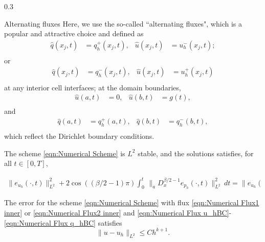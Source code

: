 \documentclass{msuposter}
\newcommand{\uh}{u_h}
\newcommand{\qh}{q_h}
\newcommand{\ph}{p_h}
\newcommand{\qhat}{\hat{q}}
\newcommand{\uhat}{\hat{u}}
\newcommand{\colwidth}{0.3\linewidth}
\begin{document}
\begin{frame}{}
\begin{columns}[t]
\begin{column}{\colwidth}
\begin{block}{Alternating fluxes}
Here, we use the so-called ``alternating fluxes", which is a popular and attractive choice and defined as
\begin{equation}\label{eqn:Numerical Flux1 inner}
\begin{aligned}
\qhat(x_j,t)&=\qh^+(x_j,t), & \uhat(x_j,t)&=\uh^-(x_j,t); \\
\end{aligned}
\end{equation}
or
\begin{equation}\label{eqn:Numerical Flux2 inner}
\begin{aligned}
\qhat(x_j,t)&=\qh^-(x_j,t), & \uhat(x_j,t)&=\uh^+(x_j,t) \\
\end{aligned}
\end{equation}
at any interior cell interfaces; 
at the domain boundaries, 
\begin{equation}\label{eqn:Numerical Flux \uh BC}
\begin{aligned}
\uhat(a,t)&=0, & \uhat(b,t)&=g(t),  \\
\end{aligned}
\end{equation}
and
\begin{equation}\label{eqn:Numerical Flux \qh BC}
\begin{aligned}
\qhat(a,t)&=\qh^+(a,t), & \qhat(b,t)&=\qh^-(b,t), \\
\end{aligned}
\end{equation}
which reflect the Dirichlet boundary conditions. 
\end{block}

\begin{theorem}[$L^2$ stability]
	The scheme \eqref{eqn:Numerical Scheme} is $L^2$ stable, and the solutions satisfies, for all $t\in [0,T]$, 
	
	\begin{equation}\label{eqn:Stability theorem}
	\begin{aligned}
	\|e_{\uh}(\cdot,t)\|_{L^2}^2 
	+  2\cos ((\beta/2-1)\pi)\int_{0}^{t} \, \|_{a}D_{x}^{\beta/2-1}e_{\ph}(\cdot,t)\|_{L^2}^2 \, dt
	= \|e_{\uh}(\cdot,0)\|_{L^2}^2. 
	\end{aligned}
	\end{equation}
\end{theorem}
	
\begin{theorem}\label{thm:accuracy}
	The error for the scheme \eqref{eqn:Numerical Scheme} with flux \eqref{eqn:Numerical Flux1 inner} or \eqref{eqn:Numerical Flux2 inner} and \eqref{eqn:Numerical Flux \uh BC}-\eqref{eqn:Numerical Flux \qh BC} satisfies
	\begin{equation}\label{eqn:accuracy thm}
	\| u - \uh \|_{L^2}  \leq Ch^{k+1}.
	\end{equation}
\end{theorem}


\end{column}
\end{columns}
\end{frame}
\end{document}
